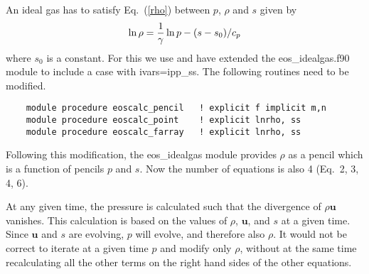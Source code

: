 \documentclass[mathleft]{article}
\begin{document}

An ideal gas has to satisfy Eq.~(\ref{rho}) between $p$, $\rho$ and $s$ given by
\begin{equation}
\ln\rho={1\over\gamma}\ln p-(s-s_0)/c_p
\end{equation}
where $s_0$ is a constant.
For this we use and have extended the eos\_idealgas.f90 module to include a case with ivars=ipp\_ss. The following routines need to be modified.
\begin{verbatim}
    module procedure eoscalc_pencil   ! explicit f implicit m,n
    module procedure eoscalc_point    ! explicit lnrho, ss
    module procedure eoscalc_farray   ! explicit lnrho, ss
\end{verbatim}
Following this modification, the eos\_idealgas module provides $\rho$ as a pencil which is a function of pencils $p$ and $s$.
Now the number of equations is also 4 (Eq.~2, 3, 4, 6).

At any given time, the pressure is calculated such that the divergence of
$\rho\bm{u}$ vanishes.
This calculation is based on the values of $\rho$, $\bm{u}$, and $s$
at a given time.
Since $\bm{u}$ and $s$ are evolving, $p$ will evolve,
and therefore also $\rho$.
It would not be correct to iterate at a given time $p$ and modify
only $\rho$, without at the same time recalculating all the other terms
on the right hand sides of the other equations.
\end{document}
